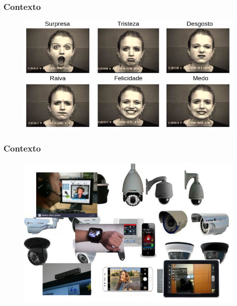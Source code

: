 \documentclass{beamer}
\begin{document}
\begin{frame}
\frametitle{Contexto}
\begin{figure}
\centering
\includegraphics[scale=0.39]{figuras/facesbasicas.png}
\label{fig:problema1}
\end{figure}
\end{frame} 



\begin{frame}
\frametitle{Contexto}
\begin{figure}
\centering
\includegraphics[scale=0.39]{figuras/contexto_21.png}
\label{fig:problema1}
\end{figure}
\end{frame}


\end{document}
